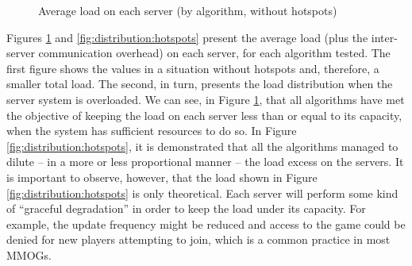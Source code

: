 \documentclass[acmjacm]{acmtrans2m}
\begin{document}
\begin{figure}[!t]
	\caption{Average load on each server (by algorithm, without hotspots)}
	\label{fig:distribution:uniform}
\end{figure}


Figures \ref{fig:distribution:uniform} and \ref{fig:distribution:hotspots} present the average load (plus the inter-server communication overhead) on each server, for each algorithm tested. The first figure shows the values in a situation without hotspots and, therefore, a smaller total load. The second, in turn, presents the load distribution when the server system is overloaded. We can see, in Figure \ref{fig:distribution:uniform}, that all algorithms have met the objective of keeping the load on each server less than or equal to its capacity, when the system has sufficient resources to do so. In Figure \ref{fig:distribution:hotspots}, it is demonstrated that all the algorithms managed to dilute -- in a more or less proportional manner -- the load excess on the servers. It is important to observe, however, that the load shown in Figure \ref{fig:distribution:hotspots} is only theoretical. Each server will perform some kind of ``graceful degradation'' in order to keep the load under its capacity. For example, the update frequency might be reduced and access to the game could be denied for new players attempting to join, which is a common practice in most MMOGs.
\end{document}

